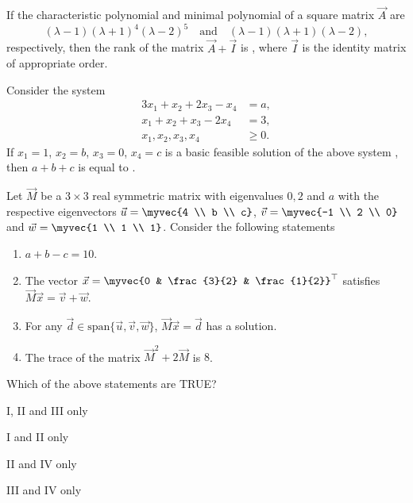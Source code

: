 \item If the characteristic polynomial and minimal polynomial of a square matrix $\vec{A}$ are  
\[
(\lambda - 1)(\lambda + 1)^4(\lambda - 2)^5
\quad \text{and} \quad
(\lambda - 1)(\lambda + 1)(\lambda - 2),
\]
respectively, then the rank of the matrix $\vec{A}+\vec{I}$ is \underline{\hspace{2cm}}, where $\vec{I}$ is the identity matrix of appropriate order.  
\hfill{}
\item Consider the system
\[
\begin{aligned}
3x_1 + x_2 + 2x_3 - x_4 &= a,\\
x_1 + x_2 + x_3 - 2x_4 &= 3,\\
x_1, x_2, x_3, x_4 &\ge 0.
\end{aligned}
\]
If $x_1=1$, $x_2=b$, $x_3=0$, $x_4=c$ is a basic feasible solution of the above system , then $a+b+c$ is equal to \underline{\hspace{2cm}}.
\hfill{}
\item Let $\vec{M}$ be a $3 \times 3$ real symmetric matrix with eigenvalues $0, 2$ and $a$ with the respective eigenvectors $\vec{u}=\myvec{4 \\ b \\ c}$, $\vec{v}=\myvec{-1 \\ 2 \\ 0}$ and $\vec{w}=\myvec{1 \\ 1 \\ 1}$.  
Consider the following statements
\begin{enumerate}[label=\Roman*.]
\item $a + b - c = 10$.
\item The vector $\vec{x}=\myvec{0 & \frac{3}{2} & \frac{1}{2}}^{\top}$ satisfies $\vec{M}\vec{x} = \vec{v} + \vec{w}$.
\item For any $\vec{d} \in \text{span}\{\vec{u},\vec{v},\vec{w}\}$, $\vec{M}\vec{x} = \vec{d}$ has a solution.
\item The trace of the matrix $\vec{M}^2 + 2\vec{M}$ is $8$.
\end{enumerate}
Which of the above statements are TRUE?
\hfill{}
\begin{enumerate}
\begin{multicols}{2}
\item I, II and III only
\item I and II only
\item II and IV only
\item III and IV only
\end{multicols}
\end{enumerate}
